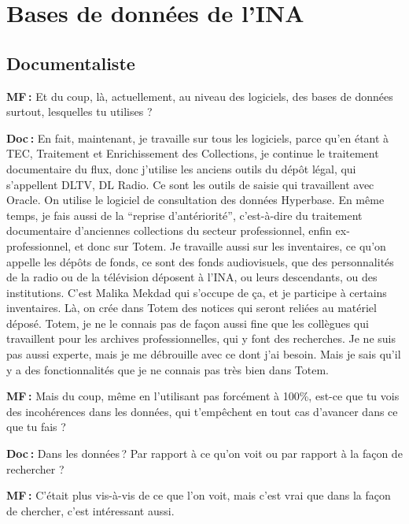 \section*{Bases de données de l’INA }

\subsection*{Documentaliste} 

\textbf{MF :} Et du coup, là, actuellement, au niveau des logiciels, des bases de données surtout, lesquelles tu utilises ? 

\textbf{Doc :} En fait, maintenant, je travaille sur tous les logiciels, parce qu'en étant à TEC, Traitement et Enrichissement des Collections, je continue le traitement documentaire du flux, donc j'utilise les anciens outils du dépôt légal, qui s'appellent DLTV, DL Radio. Ce sont les outils de saisie qui travaillent avec Oracle. On utilise le logiciel de consultation des données Hyperbase. En même temps, je fais aussi de la “reprise d'antériorité”, c'est-à-dire du traitement documentaire d'anciennes collections du secteur professionnel, enfin ex-professionnel, et donc sur Totem. Je travaille aussi sur les inventaires, ce qu'on appelle les dépôts de fonds, ce sont des fonds audiovisuels, que des personnalités de la radio ou de la télévision déposent à l'INA, ou leurs descendants, ou des institutions. C'est Malika Mekdad qui s'occupe de ça, et je participe à certains inventaires. Là, on crée dans Totem des notices qui seront reliées au matériel déposé. Totem, je ne le connais pas de façon aussi fine que les collègues qui travaillent pour les archives professionnelles, qui y font des recherches. Je ne suis pas aussi experte, mais je me débrouille avec ce dont j'ai besoin.  Mais je sais qu'il y a des fonctionnalités que je ne connais pas très bien dans Totem.

\textbf{MF :} Mais du coup, même en l'utilisant pas forcément à 100\%, est-ce que tu vois des incohérences dans les données, qui t'empêchent en tout cas d'avancer dans ce que tu fais ?  

\textbf{Doc :} Dans les données ? Par rapport à ce qu'on voit ou par rapport à la façon de rechercher ?  

\textbf{MF :} C'était plus vis-à-vis de ce que l'on voit, mais c'est vrai que dans la façon de chercher, c'est intéressant aussi. 

